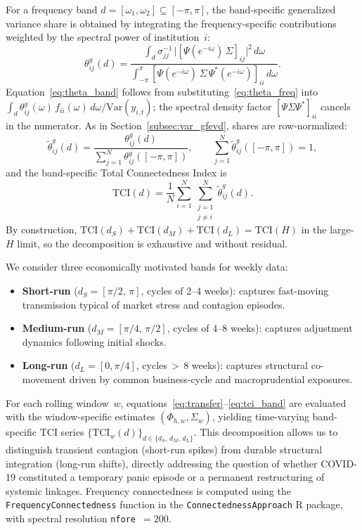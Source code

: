 For a frequency band $d = [\omega_1,\omega_2]\subseteq[-\pi,\pi]$, the band-specific
generalized variance share is obtained by integrating the frequency-specific
contributions weighted by the spectral power of institution~$i$:
\begin{equation}\label{eq:theta_band}
  \theta^g_{ij}(d)
  = \frac{
      \displaystyle\int_{d}
        \sigma_{jj}^{-1}\,
        \bigl|[\Psi(e^{-i\omega})\,\Sigma]_{ij}\bigr|^{2}
      \,d\omega
    }{
      \displaystyle\int_{-\pi}^{\pi}
        [\Psi(e^{-i\omega})\,\Sigma\,\Psi^*(e^{-i\omega})]_{ii}
      \,d\omega
    }.
\end{equation}
Equation~\eqref{eq:theta_band} follows from substituting~\eqref{eq:theta_freq} into
$\int_d \theta^g_{ij}(\omega)\,f_{ii}(\omega)\,d\omega / \mathrm{Var}(y_{i,t})$;
the spectral density factor $[\Psi\Sigma\Psi^*]_{ii}$ cancels in the numerator.
As in Section~\ref{subsec:var_gfevd}, shares are row-normalized:
\begin{equation}\label{eq:theta_band_norm}
  \tilde\theta^g_{ij}(d)
  = \frac{\theta^g_{ij}(d)}{\displaystyle\sum_{j=1}^{N}\theta^g_{ij}([-\pi,\pi])},
  \qquad
  \sum_{j=1}^{N}\tilde\theta^g_{ij}([-\pi,\pi]) = 1,
\end{equation}
and the band-specific Total Connectedness Index is
\begin{equation}\label{eq:tci_band}
  \mathrm{TCI}(d)
  = \frac{1}{N}
    \sum_{i=1}^{N}\sum_{\substack{j=1\\j\neq i}}^{N}
    \tilde\theta^g_{ij}(d).
\end{equation}
By construction, $\mathrm{TCI}(d_S) + \mathrm{TCI}(d_M) + \mathrm{TCI}(d_L) =
\mathrm{TCI}(H)$ in the large-$H$ limit, so the decomposition is exhaustive and
without residual.

We consider three economically motivated bands for weekly data:
\begin{itemize}
  \item \textbf{Short-run} ($d_S = [\pi/2,\,\pi]$, cycles of 2--4 weeks): captures
    fast-moving transmission typical of market stress and contagion episodes.
  \item \textbf{Medium-run} ($d_M = [\pi/4,\,\pi/2]$, cycles of 4--8 weeks): captures
    adjustment dynamics following initial shocks.
  \item \textbf{Long-run} ($d_L = [0,\pi/4]$, cycles\,$>\,$8 weeks): captures structural
    co-movement driven by common business-cycle and macroprudential exposures.
\end{itemize}
For each rolling window~$w$,
equations~\eqref{eq:transfer}--\eqref{eq:tci_band} are evaluated with the
window-specific estimates $(\Phi_{h,w}, \Sigma_w)$, yielding time-varying band-specific
TCI series $\{\mathrm{TCI}_w(d)\}_{d\in\{d_S,\,d_M,\,d_L\}}$. This decomposition
allows us to distinguish transient contagion (short-run spikes) from durable structural
integration (long-run shifts), directly addressing the question of whether COVID-19
constituted a temporary panic episode or a permanent restructuring of systemic linkages.
Frequency connectedness is computed using the \texttt{FrequencyConnectedness} function
in the \texttt{ConnectednessApproach} \textsf{R} package, with spectral resolution
\texttt{nfore}~$= 200$.

